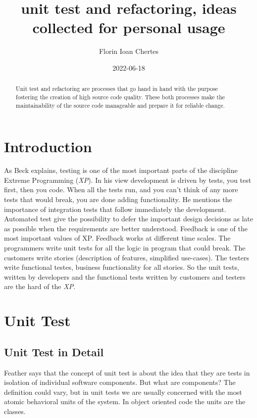 \documentclass{article}
\title{unit test and refactoring, ideas collected for personal usage}
\date{2022-06-18}
\author{Florin Ioan Chertes}
\begin{document}
\maketitle
{}
\newpage
{}


\begin{abstract}
Unit test and refactoring are processes that go hand in hand with the purpose fostering the creation of high source code quality. These both processes make the maintainability of the source code manageable and prepare it for reliable change.
\end{abstract}

\section{Introduction}

As Beck \cite{BecAnd04extreme, beck2001planning} explains, testing is one of the most important parts of the discipline Extreme Programming (\textit{XP}). In his view development is driven by tests, you test first, then you code. When all the tests run, and you can't think of any more tests that would break, you are done adding functionality. He mentions the importance of integration tests that follow immediately the development. Automated test give the possibility to defer the important design decisions as late as possible when the requirements are better understood. Feedback is one of the most important values of XP. Feedback works at different time scales. The programmers write unit tests for all the logic in program that could break. The customers write stories (description of features, simplified use-cases). The testers write functional testes, business functionality for all stories. So the unit tests, written by developers and the functional tests written by customers and testers are the hard of the \textit{XP}.   

\section{Unit Test}

\subsection{Unit Test in Detail}

Feather \cite{FeathersMichael} says that the concept of unit test is about the idea that they are tests in isolation of individual software components. But what are components? The definition could vary, but in unit tests we are usually concerned with the most atomic behavioral units of the system. In object oriented code the units are the classes.
\end{document}
